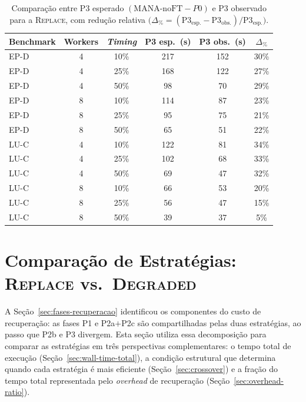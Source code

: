\begin{table}[htb]
  \caption{Comparação entre P3 esperado $(\text{MANA-noFT} - P0)$ e P3 observado
           para a \textsc{Replace}, com redução relativa
           $\bigl(\Delta_{\%} = (\text{P3}_\text{esp.} - \text{P3}_\text{obs.}) /
           \text{P3}_\text{esp.}\bigr)$.}
  \label{tab:warm-restart-gap}
  \centering
  \small
  \begin{tabular}{l c c c c c}
    \toprule
    Benchmark & Workers & \textit{Timing} & P3 esp.\ (s) & P3 obs.\ (s) & $\Delta_{\%}$ \\
    \midrule
    EP-D & 4 & 10\% & 217 & 152 & 30\% \\
    EP-D & 4 & 25\% & 168 & 122 & 27\% \\
    EP-D & 4 & 50\% &  98 &  70 & 29\% \\
    \addlinespace
    EP-D & 8 & 10\% & 114 &  87 & 23\% \\
    EP-D & 8 & 25\% &  95 &  75 & 21\% \\
    EP-D & 8 & 50\% &  65 &  51 & 22\% \\
    \addlinespace
    LU-C & 4 & 10\% & 122 &  81 & 34\% \\
    LU-C & 4 & 25\% & 102 &  68 & 33\% \\
    LU-C & 4 & 50\% &  69 &  47 & 32\% \\
    \addlinespace
    LU-C & 8 & 10\% &  66 &  53 & 20\% \\
    LU-C & 8 & 25\% &  56 &  47 & 15\% \\
    LU-C & 8 & 50\% &  39 &  37 &  5\% \\
    \bottomrule
  \end{tabular}
\end{table}


\section{Comparação de Estratégias: \textsc{Replace} vs.\ \textsc{Degraded}}
\label{sec:comparacao-estrategias}

A Seção~\ref{sec:fases-recuperacao} identificou os componentes do custo de
recuperação: as fases P1 e P2a$+$P2c são compartilhadas pelas duas estratégias,
ao passo que P2b e P3 divergem. Esta seção utiliza essa decomposição para
comparar as estratégias em três perspectivas complementares: o tempo total de
execução (Seção~\ref{sec:wall-time-total}), a condição estrutural que determina
quando cada estratégia é mais eficiente (Seção~\ref{sec:crossover}) e a fração
do tempo total representada pelo \textit{overhead} de recuperação
(Seção~\ref{sec:overhead-ratio}).

